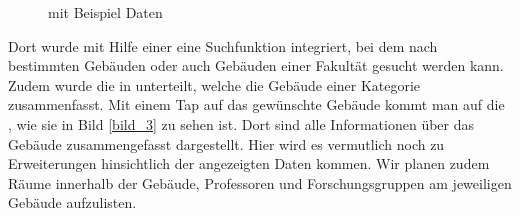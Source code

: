 \documentclass{report}
\begin{document}
\begin{figure}[ht]
\centering {}
\caption{ mit Beispiel Daten}\label{bild_6}
\end{figure}

Dort wurde mit Hilfe einer  eine Suchfunktion integriert, bei dem nach bestimmten Gebäuden oder auch Gebäuden einer Fakultät gesucht werden kann. Zudem wurde die  in  unterteilt, welche die Gebäude einer Kategorie zusammenfasst. Mit einem Tap auf das gewünschte Gebäude kommt man auf die , wie sie in Bild \ref{bild_3} zu sehen ist. Dort sind alle Informationen über das Gebäude zusammengefasst dargestellt. Hier wird es vermutlich noch zu Erweiterungen hinsichtlich der angezeigten Daten kommen. Wir planen zudem Räume innerhalb der Gebäude, Professoren und Forschungsgruppen am jeweiligen Gebäude aufzulisten.
\end{document}
